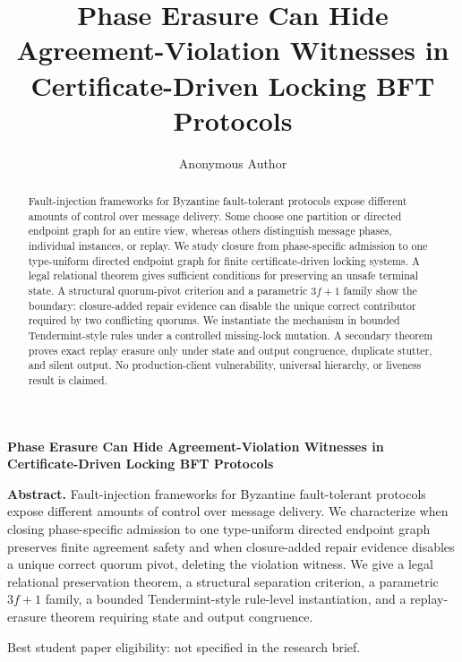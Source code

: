 \documentclass[a4paper,USenglish,cleveref,autoref,thm-restate,anonymous]{lipics-v2021}
\title{Phase Erasure Can Hide Agreement-Violation Witnesses in Certificate-Driven Locking BFT Protocols}
\author{Anonymous Author}{Anonymous Institution}{anonymous@example.invalid}{}{}
\begin{document}
\begin{titlepage}
\centering
\vspace*{22mm}
{\LARGE\bfseries Phase Erasure Can Hide Agreement-Violation Witnesses in Certificate-Driven Locking BFT Protocols\par}
\vspace{12mm}
\begin{minipage}{0.88\textwidth}
\textbf{Abstract.}
Fault-injection frameworks for Byzantine fault-tolerant protocols expose different amounts of control over message delivery. We characterize when closing phase-specific admission to one type-uniform directed endpoint graph preserves finite agreement safety and when closure-added repair evidence disables a unique correct quorum pivot, deleting the violation witness. We give a legal relational preservation theorem, a structural separation criterion, a parametric $3f+1$ family, a bounded Tendermint-style rule-level instantiation, and a replay-erasure theorem requiring state and output congruence.
\end{minipage}
\vfill
{\small Best student paper eligibility: not specified in the research brief.\par}
\end{titlepage}

\maketitle

\begin{abstract}
Fault-injection frameworks for Byzantine fault-tolerant protocols expose different amounts of control over message delivery. Some choose one partition or directed endpoint graph for an entire view, whereas others distinguish message phases, individual instances, or replay. We study closure from phase-specific admission to one type-uniform directed endpoint graph for finite certificate-driven locking systems. A legal relational theorem gives sufficient conditions for preserving an unsafe terminal state. A structural quorum-pivot criterion and a parametric $3f+1$ family show the boundary: closure-added repair evidence can disable the unique correct contributor required by two conflicting quorums. We instantiate the mechanism in bounded Tendermint-style rules under a controlled missing-lock mutation. A secondary theorem proves exact replay erasure only under state and output congruence, duplicate stutter, and silent output. No production-client vulnerability, universal hierarchy, or liveness result is claimed.
\end{abstract}





\end{document}
